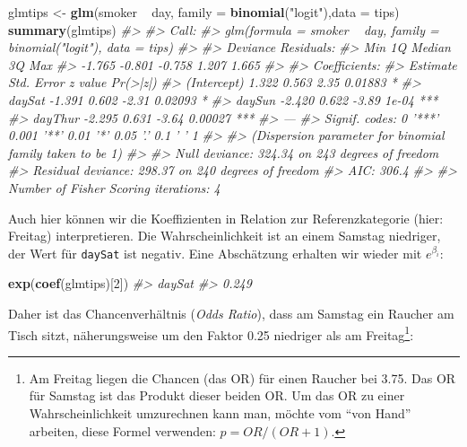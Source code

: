 \documentclass[12pt,]{book}
\makeatletter
\newenvironment{Shaded}{\begin{snugshade}}{\end{snugshade}}
\newcommand{\KeywordTok}[1]{\textcolor[rgb]{0.13,0.29,0.53}{\textbf{{#1}}}}
\newcommand{\DataTypeTok}[1]{\textcolor[rgb]{0.13,0.29,0.53}{{#1}}}
\newcommand{\DecValTok}[1]{\textcolor[rgb]{0.00,0.00,0.81}{{#1}}}
\newcommand{\StringTok}[1]{\textcolor[rgb]{0.31,0.60,0.02}{{#1}}}
\newcommand{\CommentTok}[1]{\textcolor[rgb]{0.56,0.35,0.01}{\textit{{#1}}}}
\newcommand{\NormalTok}[1]{{#1}}
\newenvironment{kframe}{%
\medskip{}
\setlength{\fboxsep}{.8em}
 \def\at@end@of@kframe{}%
 \ifinner\ifhmode%
  \def\at@end@of@kframe{\end{minipage}}%
  \begin{minipage}{\columnwidth}%
 \fi\fi%
 \def\FrameCommand##1{\hskip\@totalleftmargin \hskip-\fboxsep
 \colorbox{shadecolor}{##1}\hskip-\fboxsep
     \hskip-\linewidth \hskip-\@totalleftmargin \hskip\columnwidth}%
 \MakeFramed {\advance\hsize-\width
   \@totalleftmargin\z@ \linewidth\hsize
   \@setminipage}}%
 {\par\unskip\endMakeFramed%
 \at@end@of@kframe}
\renewenvironment{Shaded}{\begin{kframe}}{\end{kframe}}
\makeatother
\begin{document}
\begin{Shaded}
\begin{Highlighting}[]
\NormalTok{glmtips <-}\StringTok{ }\KeywordTok{glm}\NormalTok{(smoker ~}\StringTok{ }\NormalTok{day, }\DataTypeTok{family =} \KeywordTok{binomial}\NormalTok{(}\StringTok{"logit"}\NormalTok{),}\DataTypeTok{data =} \NormalTok{tips)}
\KeywordTok{summary}\NormalTok{(glmtips)}
\CommentTok{#> }
\CommentTok{#> Call:}
\CommentTok{#> glm(formula = smoker ~ day, family = binomial("logit"), data = tips)}
\CommentTok{#> }
\CommentTok{#> Deviance Residuals: }
\CommentTok{#>    Min      1Q  Median      3Q     Max  }
\CommentTok{#> -1.765  -0.801  -0.758   1.207   1.665  }
\CommentTok{#> }
\CommentTok{#> Coefficients:}
\CommentTok{#>             Estimate Std. Error z value Pr(>|z|)    }
\CommentTok{#> (Intercept)    1.322      0.563    2.35  0.01883 *  }
\CommentTok{#> daySat        -1.391      0.602   -2.31  0.02093 *  }
\CommentTok{#> daySun        -2.420      0.622   -3.89    1e-04 ***}
\CommentTok{#> dayThur       -2.295      0.631   -3.64  0.00027 ***}
\CommentTok{#> ---}
\CommentTok{#> Signif. codes:  0 '***' 0.001 '**' 0.01 '*' 0.05 '.' 0.1 ' ' 1}
\CommentTok{#> }
\CommentTok{#> (Dispersion parameter for binomial family taken to be 1)}
\CommentTok{#> }
\CommentTok{#>     Null deviance: 324.34  on 243  degrees of freedom}
\CommentTok{#> Residual deviance: 298.37  on 240  degrees of freedom}
\CommentTok{#> AIC: 306.4}
\CommentTok{#> }
\CommentTok{#> Number of Fisher Scoring iterations: 4}
\end{Highlighting}
\end{Shaded}

Auch hier können wir die Koeffizienten in Relation zur Referenzkategorie
(hier: Freitag) interpretieren. Die Wahrscheinlichkeit ist an einem
Samstag niedriger, der Wert für \texttt{daySat} ist negativ. Eine
Abschätzung erhalten wir wieder mit \(e^{\beta_i}\):

\begin{Shaded}
\begin{Highlighting}[]
\KeywordTok{exp}\NormalTok{(}\KeywordTok{coef}\NormalTok{(glmtips)[}\DecValTok{2}\NormalTok{])}
\CommentTok{#> daySat }
\CommentTok{#>  0.249}
\end{Highlighting}
\end{Shaded}

Daher ist das Chancenverhältnis (\emph{Odds Ratio}), dass am Samstag ein
Raucher am Tisch sitzt, näherungsweise um den Faktor 0.25 niedriger als
am Freitag\footnote{Am Freitag liegen die Chancen (das OR) für einen
  Raucher bei 3.75. Das OR für Samstag ist das Produkt dieser beiden OR.
  Um das OR zu einer Wahrscheinlichkeit umzurechnen kann man, möchte vom
  ``von Hand'' arbeiten, diese Formel verwenden: \(p = OR / (OR + 1)\).}:
\end{document}
